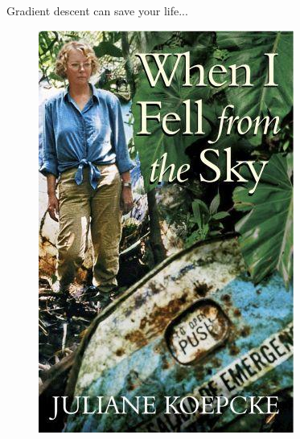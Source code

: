 \documentclass[xcolor=pdftex,dvipsnames,table,mathserif]{beamer}
\begin{document}
\begin{frame}{Gradient descent can save your life...}

  \pause

  \begin{figure}[ht]
    \centering
    \includegraphics[height=0.6\textheight]{koepcke.jpg}
  \end{figure}

\end{frame}
\end{document}
